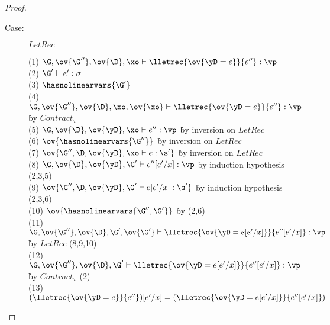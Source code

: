 \begin{proof}
\begin{description}
\item[Case:] $LetRec$
\begin{tabbing}
    (1) $\G, \ov{\G''}, \ov{\D}, \xo \vdash \lletrec{\ov{\yD = e}}{e''} : \vp$\\
    (2) $\G' \vdash e' : \sigma$\\
    (3) $\hasnolinearvars{\G'}$\\
    (4) $\G, \ov{\G''}, \ov{\D}, \xo, \ov{\xo} \vdash \lletrec{\ov{\yD = e}}{e''} : \vp$ \` by $Contract_\omega$\\
    (5) $\G, \ov{\D}, \ov{\yD}, \xo \vdash e'' : \vp$ \` by inversion on $LetRec$\\
    (6) $\ov{\hasnolinearvars{\G''}}$ \` by inversion on $LetRec$\\
    (7) $\ov{\G'', \D, \ov{\yD}, \xo \vdash e : \s'}$ \` by inversion on $LetRec$\\
    (8) $\G, \ov{\D}, \ov{\yD}, \G' \vdash e''[e'/x] : \vp$ \` by induction hypothesis (2,3,5)\\
    (9) $\ov{\G'', \D, \ov{\yD}, \G' \vdash e[e'/x] : \s'}$ \` by induction hypothesis (2,3,6)\\
    (10) $\ov{\hasnolinearvars{\G'',\G'}}$ \` by (2,6)\\
    (11) $\G, \ov{\G''}, \ov{\D}, \G', \ov{\G'} \vdash \lletrec{\ov{\yD = e[e'/x]}}{e''[e'/x]} : \vp$ \` by $LetRec$ (8,9,10)\\
    (12) $\G, \ov{\G''}, \ov{\D}, \G' \vdash \lletrec{\ov{\yD = e[e'/x]}}{e''[e'/x]} : \vp$ \` by $Contract_\omega$ (2)\\
    (13) $(\lletrec{\ov{\yD = e}}{e''})[e'/x] = (\lletrec{\ov{\yD = e[e'/x]}}{e''[e'/x]})$
\end{tabbing}


\end{description}
\end{proof}
